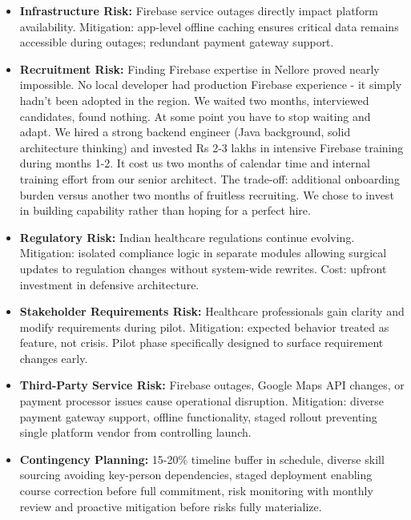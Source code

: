 \documentclass[12pt,a4paper]{report}
\begin{document}
\begin{itemize}
  \item \textbf{Infrastructure Risk:} Firebase service outages directly impact platform availability. Mitigation: app-level offline caching ensures critical data remains accessible during outages; redundant payment gateway support.

  \item \textbf{Recruitment Risk:} Finding Firebase expertise in Nellore proved nearly impossible. No local developer had production Firebase experience - it simply hadn't been adopted in the region. We waited two months, interviewed candidates, found nothing. At some point you have to stop waiting and adapt. We hired a strong backend engineer (Java background, solid architecture thinking) and invested Rs 2-3 lakhs in intensive Firebase training during months 1-2. It cost us two months of calendar time and internal training effort from our senior architect. The trade-off: additional onboarding burden versus another two months of fruitless recruiting. We chose to invest in building capability rather than hoping for a perfect hire.

  \item \textbf{Regulatory Risk:} Indian healthcare regulations continue evolving. Mitigation: isolated compliance logic in separate modules allowing surgical updates to regulation changes without system-wide rewrites. Cost: upfront investment in defensive architecture.

  \item \textbf{Stakeholder Requirements Risk:} Healthcare professionals gain clarity and modify requirements during pilot. Mitigation: expected behavior treated as feature, not crisis. Pilot phase specifically designed to surface requirement changes early.

  \item \textbf{Third-Party Service Risk:} Firebase outages, Google Maps API changes, or payment processor issues cause operational disruption. Mitigation: diverse payment gateway support, offline functionality, staged rollout preventing single platform vendor from controlling launch.

  \item \textbf{Contingency Planning:} 15-20\% timeline buffer in schedule, diverse skill sourcing avoiding key-person dependencies, staged deployment enabling course correction before full commitment, risk monitoring with monthly review and proactive mitigation before risks fully materialize.
\end{itemize}
\end{document}
